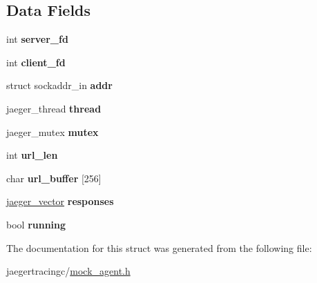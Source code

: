 \subsection*{Data Fields}
\begin{DoxyCompactItemize}
\item 
\mbox{\label{structmock__http__server_ae37fd367e210cee4c93302e6fcfe5a61}} 
int {\bfseries server\+\_\+fd}
\item 
\mbox{\label{structmock__http__server_a1cd85307eb3afeb5abefb9a5592da26a}} 
int {\bfseries client\+\_\+fd}
\item 
\mbox{\label{structmock__http__server_a3e764b1aa369a072c6800691282eb565}} 
struct sockaddr\+\_\+in {\bfseries addr}
\item 
\mbox{\label{structmock__http__server_a1c7234ec8655fb858f46f07d0efd8f4b}} 
jaeger\+\_\+thread {\bfseries thread}
\item 
\mbox{\label{structmock__http__server_ae2709e705dd2cbd522eb67cb9a0c3fb2}} 
jaeger\+\_\+mutex {\bfseries mutex}
\item 
\mbox{\label{structmock__http__server_aeb11e869375473bf163ef4e9076d6420}} 
int {\bfseries url\+\_\+len}
\item 
\mbox{\label{structmock__http__server_aa2243bd528132dc160cf43ca40a98806}} 
char {\bfseries url\+\_\+buffer} \mbox{[}256\mbox{]}
\item 
\mbox{\label{structmock__http__server_a203991412b7922751d66caa61b93fc3b}} 
\mbox{\hyperlink{structjaeger__vector}{jaeger\+\_\+vector}} {\bfseries responses}
\item 
\mbox{\label{structmock__http__server_ac6d78cdeceef6f2112b2a4b7f02a383d}} 
bool {\bfseries running}
\end{DoxyCompactItemize}


The documentation for this struct was generated from the following file\+:\begin{DoxyCompactItemize}
\item 
jaegertracingc/\mbox{\hyperlink{mock__agent_8h}{mock\+\_\+agent.\+h}}\end{DoxyCompactItemize}
